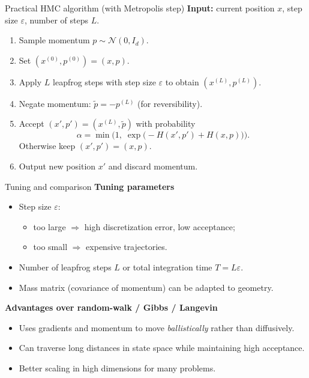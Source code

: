 \documentclass{beamer}
\begin{document}
\begin{frame}{Practical HMC algorithm (with Metropolis step)}
  \textbf{Input:} current position $x$, step size $\varepsilon$, number of steps $L$.
  \begin{enumerate}
    \item Sample momentum $p \sim \mathcal{N}(0,I_d)$.
    \item Set $(x^{(0)},p^{(0)}) = (x,p)$.
    \item Apply $L$ leapfrog steps with step size $\varepsilon$ to obtain
          $(x^{(L)}, p^{(L)})$.
    \item Negate momentum: $\tilde p = -p^{(L)}$ (for reversibility).
    \item Accept $(x',p')=(x^{(L)},\tilde p)$ with probability
      \[
        \alpha = \min\Big(1,\;
          \exp\big(-H(x',p') + H(x,p)\big)\Big).
      \]
      Otherwise keep $(x',p')=(x,p)$.
    \item Output new position $x'$ and discard momentum.
  \end{enumerate}
\end{frame}

\begin{frame}{Tuning and comparison}
  \textbf{Tuning parameters}
  \begin{itemize}
    \item Step size $\varepsilon$:
      \begin{itemize}
        \item too large $\Rightarrow$ high discretization error, low acceptance;
        \item too small $\Rightarrow$ expensive trajectories.
      \end{itemize}
    \item Number of leapfrog steps $L$ or total integration time $T = L\varepsilon$.
    \item Mass matrix (covariance of momentum) can be adapted to geometry.
  \end{itemize}

  \vspace{0.2cm}
  \textbf{Advantages over random-walk / Gibbs / Langevin}
  \begin{itemize}
    \item Uses gradients and momentum to move \emph{ballistically} rather than diffusively.
    \item Can traverse long distances in state space while maintaining high acceptance.
    \item Better scaling in high dimensions for many problems.
  \end{itemize}
\end{frame}
\end{document}
